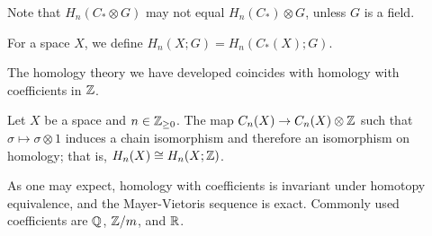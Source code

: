 Note that $H_n(C_* \otimes G)$ may not equal $H_n(C_*) \otimes G$, unless $G$ is a field.

\begin{definition}
  For a space $X$, we define $H_n(X;G) = H_n(C_*(X); G)$.
\end{definition}

The homology theory we have developed coincides with homology with coefficients in $\mathbb{Z}$.

\begin{lemma}
  Let $X$ be a space and $n \in \mathbb{Z}_{\geq 0}$. The map $C_n(X) \to C_n(X) \otimes \mathbb{Z}$ such that $\sigma \mapsto \sigma \otimes 1$ induces a chain isomorphism and therefore an isomorphism on homology; that is, $H_n(X) \cong H_n(X; \mathbb{Z})$.
\end{lemma}

As one may expect, homology with coefficients is invariant under homotopy equivalence, and the Mayer-Vietoris sequence is exact. Commonly used coefficients are $\mathbb{Q}$, $\mathbb{Z}/m$, and $\mathbb{R}$.

